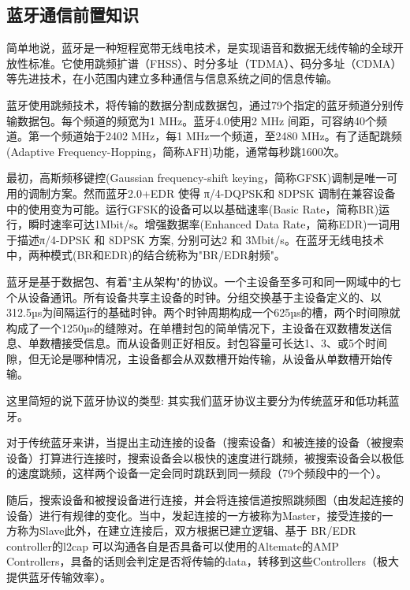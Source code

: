 \subsection[]{蓝牙通信前置知识}
简单地说，蓝牙是一种短程宽带无线电技术，是实现语音和数据无线传输的全球开放性标准。它使用跳频扩谱（FHSS）、时分多址（TDMA）、码分多址（CDMA）等先进技术，在小范围内建立多种通信与信息系统之间的信息传输。

蓝牙使用跳频技术，将传输的数据分割成数据包，通过79个指定的蓝牙频道分别传输数据包。每个频道的频宽为1 MHz。蓝牙4.0使用2 MHz 间距，可容纳40个频道。第一个频道始于2402 MHz，每1 MHz一个频道，至2480 MHz。有了适配跳频(Adaptive Frequency-Hopping，简称AFH)功能，通常每秒跳1600次。

最初，高斯频移键控(Gaussian frequency-shift keying，简称GFSK)调制是唯一可用的调制方案。然而蓝牙2.0+EDR 使得 π/4-DQPSK和 8DPSK 调制在兼容设备中的使用变为可能。运行GFSK的设备可以以基础速率(Basic Rate，简称BR)运行，瞬时速率可达1Mbit/s。增强数据率(Enhanced Data Rate，简称EDR)一词用于描述π/4-DPSK 和 8DPSK 方案, 分别可达2 和 3Mbit/s。在蓝牙无线电技术中，两种模式(BR和EDR)的结合统称为"BR/EDR射频"。

蓝牙是基于数据包、有着"主从架构"的协议。一个主设备至多可和同一网域中的七个从设备通讯。所有设备共享主设备的时钟。分组交换基于主设备定义的、以312.5µs为间隔运行的基础时钟。两个时钟周期构成一个625µs的槽，两个时间隙就构成了一个1250µs的缝隙对。在单槽封包的简单情况下，主设备在双数槽发送信息、单数槽接受信息。而从设备则正好相反。封包容量可长达1、3、或5个时间隙，但无论是哪种情况，主设备都会从双数槽开始传输，从设备从单数槽开始传输。

这里简短的说下蓝牙协议的类型: 
其实我们蓝牙协议主要分为传统蓝牙和低功耗蓝牙。

对于传统蓝牙来讲，当提出主动连接的设备（搜索设备）和被连接的设备（被搜索设备）打算进行连接时，搜索设备会以极快的速度进行跳频，被搜索设备会以极低的速度跳频，这样两个设备一定会同时跳跃到同一频段（79个频段中的一个）。

随后，搜索设备和被搜设备进行连接，并会将连接信道按照跳频图（由发起连接的设备）进行有规律的变化。当中，发起连接的一方被称为Master，接受连接的一方称为Slave此外，在建立连接后，双方根据已建立逻辑、基于 BR/EDR controller的l2cap 可以沟通各自是否具备可以使用的Altemate的AMP Controllers，具备的话则会判定是否将传输的data，转移到这些Controllers（极大提供蓝牙传输效率）。

